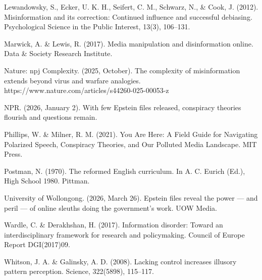 \documentclass[11pt,a4paper]{article}
\begin{document}
Lewandowsky, S., Ecker, U. K. H., Seifert, C. M., Schwarz, N., \& Cook, J. (2012). Misinformation and its correction: Continued influence and successful debiasing. Psychological Science in the Public Interest, 13(3), 106–131.


Marwick, A. \& Lewis, R. (2017). Media manipulation and disinformation online. Data \& Society Research Institute.


Nature: npj Complexity. (2025, October). The complexity of misinformation extends beyond virus and warfare analogies. https://www.nature.com/articles/s44260-025-00053-z


NPR. (2026, January 2). With few Epstein files released, conspiracy theories flourish and questions remain.


Phillips, W. \& Milner, R. M. (2021). You Are Here: A Field Guide for Navigating Polarized Speech, Conspiracy Theories, and Our Polluted Media Landscape. MIT Press.


Postman, N. (1970). The reformed English curriculum. In A. C. Eurich (Ed.), High School 1980. Pittman.


University of Wollongong. (2026, March 26). Epstein files reveal the power — and peril — of online sleuths doing the government's work. UOW Media.


Wardle, C. \& Derakhshan, H. (2017). Information disorder: Toward an interdisciplinary framework for research and policymaking. Council of Europe Report DGI(2017)09.


Whitson, J. A. \& Galinsky, A. D. (2008). Lacking control increases illusory pattern perception. Science, 322(5898), 115–117.
\end{document}

